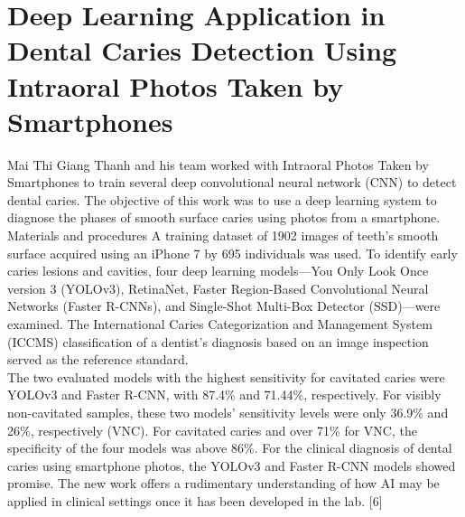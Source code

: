 \section{Deep Learning Application in Dental Caries Detection Using Intraoral Photos Taken by Smartphones} Mai Thi Giang Thanh and his team worked with Intraoral Photos Taken by Smartphones to train several deep convolutional neural network (CNN) to detect dental caries. The objective of this work was to use a deep learning system to diagnose the phases of smooth surface caries using photos from a smartphone. Materials and procedures A training dataset of 1902 images of teeth's smooth surface acquired using an iPhone 7 by 695 individuals was used. To identify early caries lesions and cavities, four deep learning models—You Only Look Once version 3 (YOLOv3), RetinaNet, Faster Region-Based Convolutional Neural Networks (Faster R-CNNs), and Single-Shot Multi-Box Detector (SSD)—were examined. The International Caries Categorization and Management System (ICCMS) classification of a dentist's diagnosis based on an image inspection served as the reference standard.\\
The two evaluated models with the highest sensitivity for cavitated caries were YOLOv3 and Faster R-CNN, with 87.4\% and 71.44\%, respectively. For visibly non-cavitated samples, these two models' sensitivity levels were only 36.9\% and 26\%, respectively (VNC). For cavitated caries and over 71\% for VNC, the specificity of the four models was above 86\%. For the clinical diagnosis of dental caries using smartphone photos, the YOLOv3 and Faster R-CNN models showed promise. The new work offers a rudimentary understanding of how AI may be applied in clinical settings once it has been developed in the lab. [6]\\

